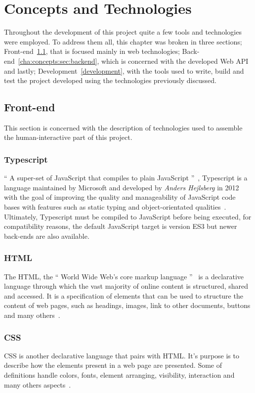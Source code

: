 \chapter{Concepts and Technologies}\label{cha:concepts}
Throughout the development of this project quite a few tools and technologies were employed. To address them all, this chapter was broken in three sections; Front-end~\ref{cha:concepts:sec:frontend}, that is focused mainly in web technologies; Back-end~\ref{cha:concepts:sec:backend}, which is concerned with the developed Web \gls{API} and lastly; Development~\ref{development}, with the tools used to write, build and test the project developed using the technologies previously discussed.

\section{Front-end}\label{cha:concepts:sec:frontend}
This section is concerned with the description of technologies used to assemble the human-interactive part of this project.

\subsection{Typescript}
`` A super-set of JavaScript that compiles to plain JavaScript ''~\cite{tswebsite}, Typescript is a language maintained by Microsoft and developed by \textit{Anders Hejlsberg} in 2012 with the goal of improving the quality and manageability of JavaScript code bases with features such as static typing and object-orientated qualities~\cite{tsrevealed}. Ultimately, Typescript must be compiled to JavaScript before being executed, for compatibility reasons, the default JavaScript target is version ES3 but newer back-ends are also available.

\subsection{HTML}
The \gls{HTML}, the `` World Wide Web's core markup language ''~\cite{html} is a declarative language through which the vast majority of online content is structured, shared and accessed. It is a specification of elements that can be used to structure the content of web pages, such as headings, images, link to other documents, buttons and many others~\cite{htmlcss}.

\subsection{CSS}
\gls{CSS} is another declarative language that pairs with HTML. It's purpose is to describe how the elements present in a web page are presented.
Some of definitions handle colors, fonts, element arranging, visibility, interaction and many others aspects~\cite{htmlcss}.

